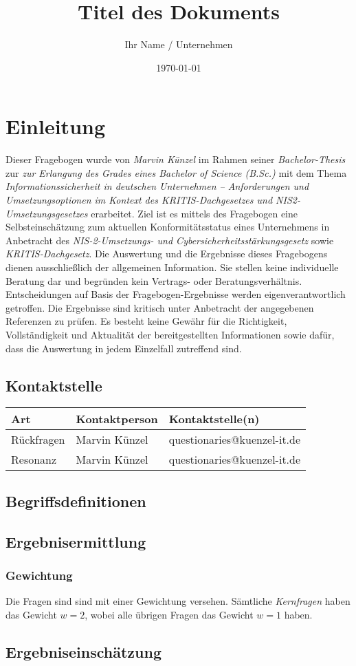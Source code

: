\documentclass[a4paper,12pt,twoside]{article} %
\title{Titel des Dokuments}
\author{Ihr Name / Unternehmen}
\date{\today}
\begin{document}
\maketitle
\thispagestyle{plain} %
\section{Einleitung}
Dieser Fragebogen wurde von \emph{Marvin Künzel} im Rahmen seiner \emph{Bachelor-Thesis} zur \emph{zur Erlangung des Grades eines Bachelor of Science (B.Sc.)} mit dem Thema \emph{Informationssicherheit in deutschen Unternehmen – Anforderungen und Umsetzungsoptionen im Kontext des KRITIS-Dachgesetzes und NIS2-Umsetzungsgesetzes} erarbeitet. Ziel ist es mittels des Fragebogen eine Selbsteinschätzung zum aktuellen Konformitätsstatus eines Unternehmens in Anbetracht des \emph{NIS-2-Umsetzungs- und Cybersicherheitsstärkungsgesetz} sowie \emph{KRITIS-Dachgesetz}. Die Auswertung und die Ergebnisse dieses Fragebogens dienen ausschließlich der allgemeinen Information. Sie stellen keine individuelle Beratung dar und begründen kein Vertrags- oder Beratungsverhältnis. Entscheidungen auf Basis der Fragebogen-Ergebnisse werden eigenverantwortlich getroffen. Die Ergebnisse sind kritisch unter Anbetracht der angegebenen Referenzen zu prüfen. Es besteht keine Gewähr für die Richtigkeit, Vollständigkeit und Aktualität der bereitgestellten Informationen sowie dafür, dass die Auswertung in jedem Einzelfall zutreffend sind.
\subsection{Kontaktstelle}
\begin{table}[h!]
\centering
\begin{tabular}{lll}
\textbf{Art} & \textbf{Kontaktperson} & \textbf{Kontaktstelle(n)}   \\ \hline
Rückfragen   & Marvin Künzel          & questionaries@kuenzel-it.de \\ \hline
Resonanz     & Marvin Künzel          & questionaries@kuenzel-it.de \\
\end{tabular}
\end{table}
\subsection{Begriffsdefinitionen}

\subsection{Ergebnisermittlung}
\subsubsection{Gewichtung}
Die Fragen sind sind mit einer Gewichtung versehen. Sämtliche \emph{Kernfragen} haben das Gewicht \(w = 2\), wobei alle übrigen Fragen das Gewicht \(w = 1\) haben.  
\subsection{Ergebniseinschätzung}
\end{document}
